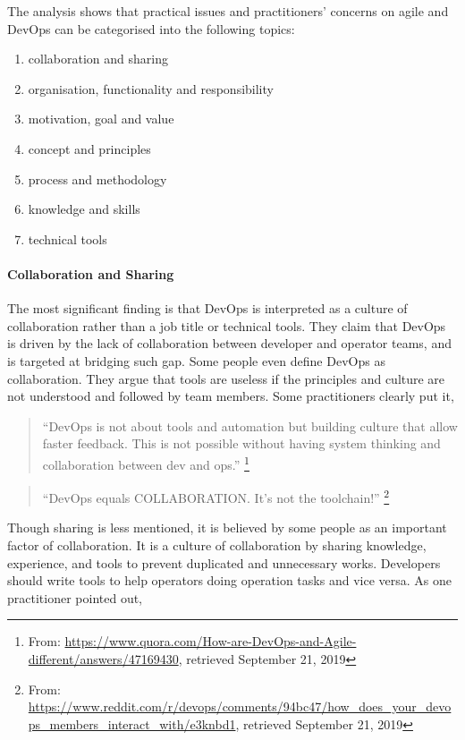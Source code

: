 \documentclass[
  12pt,
  a4paper,
]{article}
\providecommand{\tightlist}{%
  \setlength{\itemsep}{0pt}\setlength{\parskip}{0pt}}
\begin{document}
The analysis shows that practical issues and practitioners' concerns on
agile and DevOps can be categorised into the following topics:

\begin{enumerate}
\def\labelenumi{\arabic{enumi}.}
\tightlist
\item
  collaboration and sharing
\item
  organisation, functionality and responsibility
\item
  motivation, goal and value
\item
  concept and principles
\item
  process and methodology
\item
  knowledge and skills
\item
  technical tools
\end{enumerate}

\hypertarget{collaboration-and-sharing}{%
\paragraph{Collaboration and Sharing}\label{collaboration-and-sharing}}

The most significant finding is that DevOps is interpreted as a culture
of collaboration rather than a job title or technical tools. They claim
that DevOps is driven by the lack of collaboration between developer and
operator teams, and is targeted at bridging such gap. Some people even
define DevOps as collaboration. They argue that tools are useless if the
principles and culture are not understood and followed by team members.
Some practitioners clearly put it,

\begin{quote}
``DevOps is not about tools and automation but building culture that
allow faster feedback. This is not possible without having system
thinking and collaboration between dev and ops.'' \footnote{From:
  \url{https://www.quora.com/How-are-DevOps-and-Agile-different/answers/47169430},
  retrieved September 21, 2019}
\end{quote}

\begin{quote}
``DevOps equals COLLABORATION. It's not the toolchain!'' \footnote{From:
  \url{https://www.reddit.com/r/devops/comments/94bc47/how_does_your_devops_members_interact_with/e3knbd1},
  retrieved September 21, 2019}
\end{quote}

Though sharing is less mentioned, it is believed by some people as an
important factor of collaboration. It is a culture of collaboration by
sharing knowledge, experience, and tools to prevent duplicated and
unnecessary works. Developers should write tools to help operators doing
operation tasks and vice versa. As one practitioner pointed out,
\end{document}
